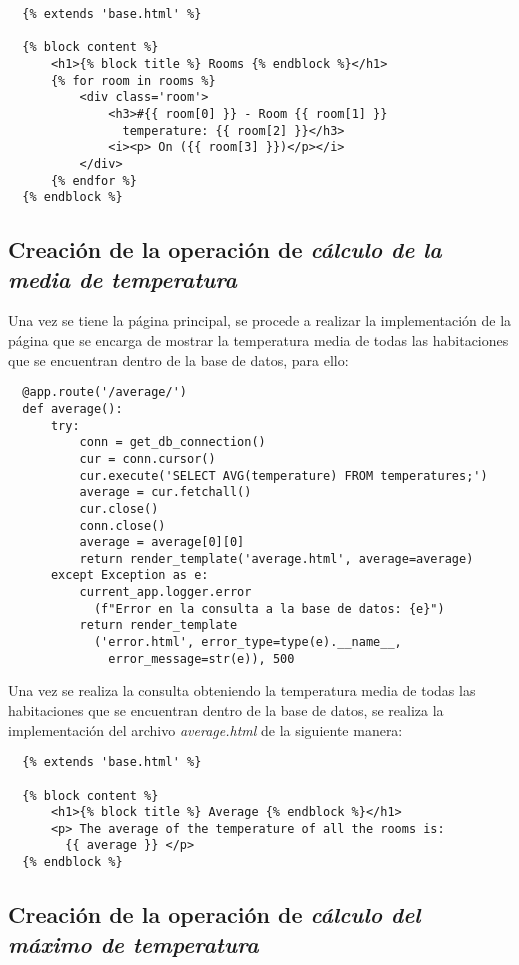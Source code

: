 \documentclass[11pt]{report}
\begin{document}
\begin{verbatim}
  {% extends 'base.html' %}

  {% block content %}
      <h1>{% block title %} Rooms {% endblock %}</h1>
      {% for room in rooms %}
          <div class='room'>
              <h3>#{{ room[0] }} - Room {{ room[1] }} 
                temperature: {{ room[2] }}</h3>
              <i><p> On ({{ room[3] }})</p></i>
          </div>
      {% endfor %}
  {% endblock %}
\end{verbatim}

\subsection{Creación de la operación de \emph{cálculo de la media de temperatura}}

Una vez se tiene la página principal, se procede a realizar la implementación de la página que se encarga de mostrar la temperatura media de todas las habitaciones que se encuentran dentro de la base de datos, para ello:

\begin{verbatim}
  @app.route('/average/')
  def average():
      try:
          conn = get_db_connection()
          cur = conn.cursor()
          cur.execute('SELECT AVG(temperature) FROM temperatures;')
          average = cur.fetchall()
          cur.close()
          conn.close()
          average = average[0][0]
          return render_template('average.html', average=average)
      except Exception as e:
          current_app.logger.error
            (f"Error en la consulta a la base de datos: {e}")
          return render_template
            ('error.html', error_type=type(e).__name__, 
              error_message=str(e)), 500
\end{verbatim}

Una vez se realiza la consulta obteniendo la temperatura media de todas las habitaciones que se encuentran dentro de la base de datos, se realiza la implementación del archivo \emph{average.html} de la siguiente manera:

\begin{verbatim}
  {% extends 'base.html' %}

  {% block content %}
      <h1>{% block title %} Average {% endblock %}</h1>
      <p> The average of the temperature of all the rooms is:
        {{ average }} </p>
  {% endblock %}
\end{verbatim}

\subsection{Creación de la operación de \emph{cálculo del máximo de temperatura}}
\end{document}
